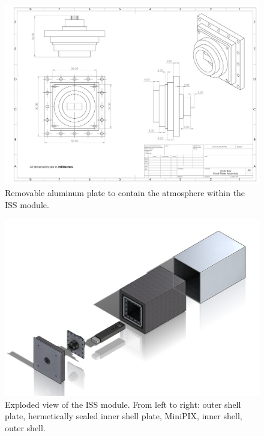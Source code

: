 \begin{centering}
\begin{figure}[H]
    \label{fig:iss-image}
  \end{figure}
  \begin{figure}[H]
    \includegraphics[width=\textwidth]{Figures/front-plate-assembly-with-feedthrough.pdf}
    \caption{Removable aluminum plate to contain the atmosphere within the ISS module.}
    \label{fig:InnerAluminumPlate}
  \end{figure}
  \begin{figure}[H]
    \includegraphics[width=\textwidth]{Figures/iss-exploded.png}
    \caption{Exploded view of the ISS module. From left to right: outer shell plate, hermetically sealed inner shell plate, MiniPIX, inner shell, outer shell.}
    \label{fig:iss-exploded-image}
  \end{figure}  

\end{centering}
